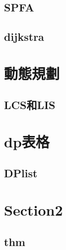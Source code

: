     \subsection{SPFA}
        
    \subsection{dijkstra}
        

        
\section{動態規劃}
    \subsection{LCS和LIS}
        

\section{dp表格}
    \subsection{DPlist}
        
    
    



\section{Section2}
    \subsection{thm}
        
